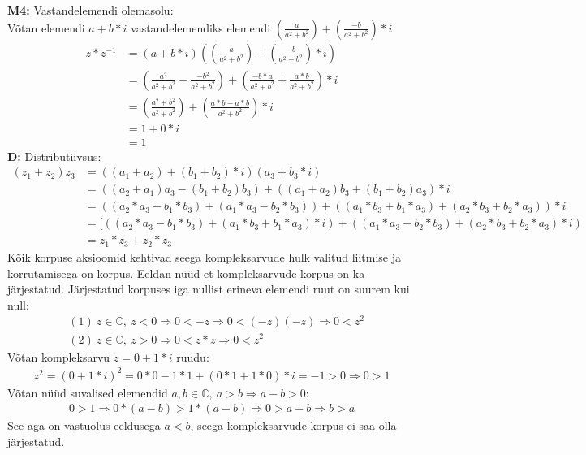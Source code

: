 \documentclass{article}
\begin{document}
\textbf{M4:} Vastandelemendi olemasolu:\\
Võtan elemendi $a+b*i$ vastandelemendiks elemendi $(\frac{a}{a^2+b^2})+(\frac{-b}{a^2+b^2})*i$
\begin {equation*}
\begin {aligned}
z*z^{-1}&=(a+b*i)((\frac{a}{a^2+b^2})+(\frac{-b}{a^2+b^2})*i)\\
&=(\frac{a^2}{a^2+b^2}-\frac{-b^2}{a^2+b^2})+(\frac{-b*a}{a^2+b^2}+\frac{a*b}{a^2+b^2})*i\\
&=(\frac{a^2+b^2}{a^2+b^2})+(\frac{a*b-a*b}{a^2+b^2})*i\\
&=1+0*i\\
&=1
\end {aligned}
\end {equation*}
\textbf{D:} Distributiivsus:
\begin {equation*}
\begin {aligned}
(z_1+z_2)z_3&=((a_1+a_2)+(b_1+b_2)*i)(a_3+b_3*i)\\
&=((a_2+a_1)a_3-(b_1+b_2)b_3)+((a_1+a_2)b_3+(b_1+b_2)a_3)*i\\
&=((a_2*a_3-b_1*b_3)+(a_1*a_3-b_2*b_3))+((a_1*b_3+b_1*a_3)+(a_2*b_3+b_2*a_3))*i\\
&=[((a_2*a_3-b_1*b_3)+(a_1*b_3+b_1*a_3)*i)+((a_1*a_3-b_2*b_3)+(a_2*b_3+b_2*a_3)*i)\\
&=z_1*z_3+z_2*z_3
\end {aligned}
\end {equation*}
Kõik korpuse aksioomid kehtivad seega kompleksarvude hulk valitud liitmise ja korrutamisega on korpus. Eeldan nüüd et kompleksarvude korpus on ka järjestatud. Järjestatud korpuses iga nullist erineva elemendi ruut on suurem kui null:
\begin {equation*}
\begin {aligned}
&(1)\ z\in\mathbb{C},\ z<0\Rightarrow0<-z\Rightarrow0<(-z)(-z)\Rightarrow0<z^2\\
&(2)\ z\in\mathbb{C},\ z>0\Rightarrow0<z*z\Rightarrow0<z^2
\end {aligned}
\end {equation*}
Võtan kompleksarvu $z=0+1*i$ ruudu:
\begin {equation*}
\begin {aligned}
z^2=(0+1*i)^2=0*0-1*1+(0*1+1*0)*i=-1>0\Rightarrow0>1
\end {aligned}
\end {equation*}
Võtan nüüd suvalised elemendid $a,b\in\mathbb{C},\ a>b\Rightarrow a-b>0$:
\begin {equation*}
\begin {aligned}
0>1\Rightarrow 0*(a-b)>1*(a-b)\Rightarrow 0>a-b\Rightarrow b>a
\end {aligned}
\end {equation*}
See aga on vastuolus eeldusega $a<b$, seega kompleksarvude korpus ei saa olla järjestatud.
\end{document}
